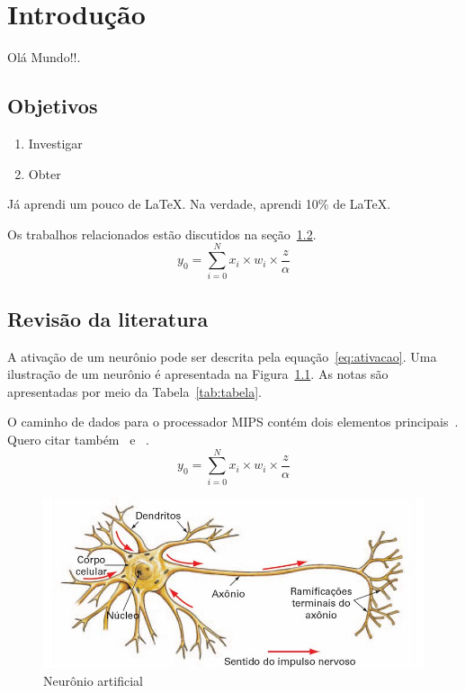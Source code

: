 \chapter{Introdução}
Olá   Mundo!!.
\section{Objetivos}
\begin{enumerate}
	\item Investigar
	\item Obter
\end{enumerate}
Já aprendi um pouco de \LaTeX.
Na verdade, aprendi 10\% de \LaTeX.

Os trabalhos relacionados estão discutidos na seção~\ref{sec:revisao}.
\begin{equation}
	y_{0} = \sum_{i=0}^{N}{x_{i} \times  w_{i}} \times \frac{z}{\alpha}
	\label{eq:teste}
\end{equation}
\section{Revisão da literatura}\label{sec:revisao}
A ativação de um neurônio pode ser descrita pela equação~\ref{eq:ativacao}.
Uma ilustração de um neurônio é apresentada na Figura~\ref{fig:neuronio}.
As notas são apresentadas por meio da Tabela~\ref{tab:tabela}.

O caminho de dados para o processador MIPS contém dois elementos principais~\cite{Hennessy2012}.
Quero citar também~\cite{Staff2018} e  ~\cite{Parham2010}.
\begin{equation}
	y_{0} = \sum_{i=0}^{N}{x_{i} \times  w_{i}} \times \frac{z}{\alpha}
	\label{eq:ativacao}
\end{equation}

\begin{figure}[htb]
	\centering
	\includegraphics[scale=.3]{neuronio}
	\caption{Neurônio artificial}
	\label{fig:neuronio}
\end{figure}


